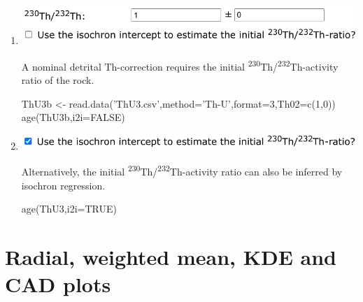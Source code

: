 \begin{refsection}
\begin{enumerate}
\begin{enumerate}
\item\begin{minipage}[t]{.7\linewidth}
    \strut\vspace*{-\baselineskip}\newline
    \includegraphics[width=\linewidth]{../figures/ThUformat34initial02.png}
  \end{minipage}
    \begin{minipage}[t]{.3\linewidth}
      A nominal detrital Th-correction requires the initial
      \textsuperscript{230}Th/\textsuperscript{232}Th-activity ratio
      of the rock.\\
    \end{minipage}    

\begin{script}
ThU3b <- read.data('ThU3.csv',method='Th-U',format=3,Th02=c(1,0))
age(ThU3b,i2i=FALSE)
\end{script}

    
\item\begin{minipage}[t]{.7\linewidth}
    \strut\vspace*{-\baselineskip}\newline
    \includegraphics[width=\linewidth]{../figures/ThUi2i.png}
  \end{minipage}
    \begin{minipage}[t]{.3\linewidth}
      Alternatively, the initial
      \textsuperscript{230}Th/\textsuperscript{232}Th-activity ratio
      can also be inferred by isochron regression.\\
    \end{minipage}    

\begin{console}
age(ThU3,i2i=TRUE)
\end{console}

  \end{enumerate}
  
\end{enumerate}

\section{Radial, weighted mean, KDE and CAD plots}


\end{refsection}
